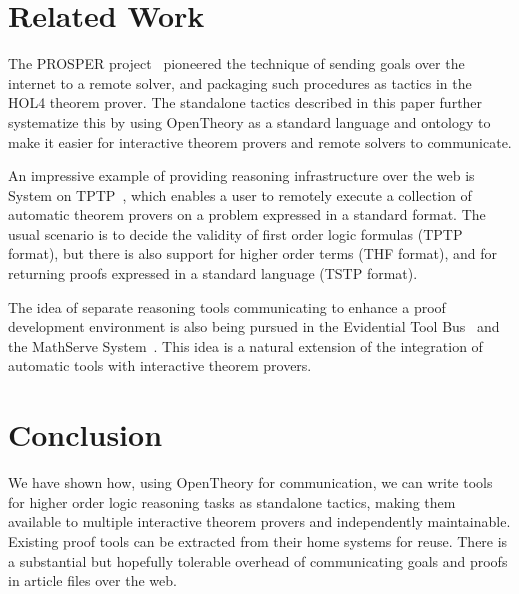\documentclass{llncs}
\newcommand{\OpenTheory}{OpenTheory\xspace}
\begin{document}



\section{Related Work}

The PROSPER project~\cite{dennis2000} pioneered the technique of sending goals over the internet to a remote solver, and packaging such procedures as tactics in the HOL4 theorem prover. The standalone tactics described in this paper further systematize this by using \OpenTheory as a standard language and ontology to make it easier for interactive theorem provers and remote solvers to communicate.

An impressive example of providing reasoning infrastructure over the web is System on TPTP~\cite{DBLP:conf/lpar/Sutcliffe10}, which enables a user to remotely execute a collection of automatic theorem provers on a problem expressed in a standard format.
The usual scenario is to decide the validity of first order logic formulas (TPTP format), but there is also support for higher order terms (THF format), and for returning proofs expressed in a standard language (TSTP format).

The idea of separate reasoning tools communicating to enhance a proof development environment is also being pursued in the Evidential Tool Bus~\cite{DBLP:conf/icfem/Rushby05} and the MathServe System~\cite{DBLP:conf/cade/ZimmerA06}.
This idea is a natural extension of the integration of automatic tools with interactive theorem provers.

\section{Conclusion}

We have shown how, using \OpenTheory for communication, we can write tools for higher order logic reasoning tasks as standalone tactics, making them available to multiple interactive theorem provers and independently maintainable.
Existing proof tools can be extracted from their home systems for reuse.
There is a substantial but hopefully tolerable overhead of communicating goals and proofs in article files over the web.



\end{document}
